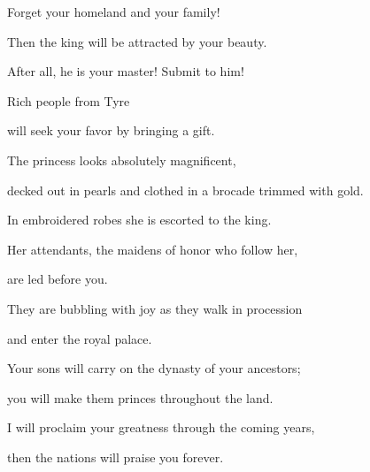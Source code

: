 {\par }{\Q Forget
your homeland
and
your family!
\par }{\Q {}Then the king
will be attracted
by your beauty.
\par }{\Q After all,
he is your master! Submit to him!
\par }{\Q {}Rich people
from Tyre
\par }{\Q will seek your favor
by bringing
a gift.
\par }{\Q {}The princess
looks absolutely
magnificent,
\par }{\Q decked out in pearls and clothed
in a brocade trimmed
with gold.
\par }{\Q {}In embroidered robes
she is escorted to
the king.
\par }{\Q Her attendants,
the maidens of honor
who follow
her,
\par }{\Q are led before you.
\par }{\Q {}They are bubbling
with joy
as they walk in procession
\par }{\Q and enter
the royal
palace.
\par }{\Q {}Your sons
will carry
on the dynasty of your ancestors;
\par }{\Q you will make
them princes
throughout
the land.
\par }{\Q {}I will proclaim
your greatness
through the coming years,
\par }{\Q then
the nations
will praise
you forever.


\par }
